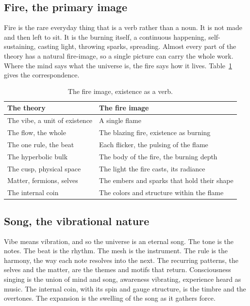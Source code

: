 \subsection{Fire, the primary image}

Fire is the rare everyday thing that is a verb rather than a noun. It is not made and then left to sit. It is the burning itself, a continuous happening, self-sustaining, casting light, throwing sparks, spreading. Almost every part of the theory has a natural fire-image, so a single picture can carry the whole work. Where the mind says what the universe is, the fire says how it lives. Table~\ref{tab:fire-image} gives the correspondence.

\begin{table}[h]
\centering
\begin{tabular}{@{}ll@{}}
\toprule
The theory & The fire image \\
\midrule
The vibe, a unit of existence & A single flame \\
The flow, the whole & The blazing fire, existence as burning \\
The one rule, the beat & Each flicker, the pulsing of the flame \\
The hyperbolic bulk & The body of the fire, the burning depth \\
The cusp, physical space & The light the fire casts, its radiance \\
Matter, fermions, selves & The embers and sparks that hold their shape \\
The internal coin & The colors and structure within the flame \\
\bottomrule
\end{tabular}
\caption{The fire image, existence as a verb.}
\label{tab:fire-image}
\end{table}

\subsection{Song, the vibrational nature}

Vibe means vibration, and so the universe is an eternal song. The tone is the notes. The beat is the rhythm. The mesh is the instrument. The rule is the harmony, the way each note resolves into the next. The recurring patterns, the selves and the matter, are the themes and motifs that return. Consciousness singing is the union of mind and song, awareness vibrating, experience heard as music. The internal coin, with its spin and gauge structure, is the timbre and the overtones. The expansion is the swelling of the song as it gathers force.

